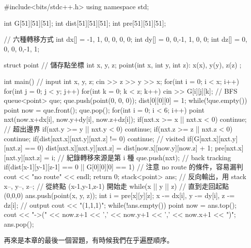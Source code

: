 \documentclass[main.tex]{subfiles}
\begin{document}
\begin{C++}
#include<bits/stdc++.h>
using namespace std;

int G[51][51][51];
int dist[51][51][51];
int pre[51][51][51];

// 六種轉移方式
int dx[] = {-1, 1, 0, 0, 0, 0};
int dy[] = { 0, 0,-1, 1, 0, 0};
int dz[] = { 0, 0, 0, 0,-1, 1};

struct point{ // 儲存點坐標
    int x, y, z;
    point(int x, int y, int z): x(x), y(y), z(z){}
};

int main(){
    // input
    int x, y, z;
    cin >> z >> y >> x;
    for(int i = 0; i < x; i++){
        for(int j = 0; j < y; j++){
            for(int k = 0; k < z; k++)
                cin >> G[i][j][k];
        }
    }
    // BFS
    queue<point> que;
    que.push(point(0, 0, 0));
    dist[0][0][0] = 1;
    while(!que.empty()){
        point now = que.front();
        que.pop();
        for(int i = 0; i < 6; i++){
            point nxt(now.x+dx[i], now.y+dy[i], now.z+dz[i]);
            if(nxt.x >= x || nxt.x < 0) continue; // 超出邊界
            if(nxt.y >= y || nxt.y < 0) continue;
            if(nxt.z >= z || nxt.z < 0) continue;
            if(dist[nxt.x][nxt.y][nxt.z] != 0) continue; // visited
            if(G[nxt.x][nxt.y][nxt.z] == 0){
                dist[nxt.x][nxt.y][nxt.z] = dist[now.x][now.y][now.z] + 1;
                pre[nxt.x][nxt.y][nxt.z] = i; // 紀錄轉移來源是第 i 種
                que.push(nxt);
            }
        }
    }
    // back tracking
    if(dist[x-1][y-1][z-1] == 0 || G[0][0][0] == 1){
        // 注意 no route 的條件，容易漏判
        cout << "no route" << endl;
        return 0;
    }
    stack<point> ans; // 反向輸出，用 stack
    x--, y--, z--; // 從終點 (x-1,y-1,z-1) 開始走
    while(x || y || z){ // 直到走回起點 (0,0,0)
        ans.push(point(x, y, z));
        int i = pre[x][y][z];
        x -= dx[i], y -= dy[i], z -= dz[i];
    }
    // output
    cout << "(1,1,1)";
    while(!ans.empty()){
        point now = ans.top();
        cout << "->(" << now.z+1 << ',' << now.y+1 << ',' << now.x+1 << ")";
        ans.pop();
    }
}
\end{C++}


再來是本章的最後一個習題，有時候我們在乎遍歷順序。\\
\end{document}
